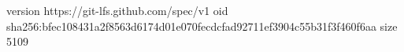 version https://git-lfs.github.com/spec/v1
oid sha256:bfec108431a2f8563d6174d01e070fecdcfad92711ef3904c55b31f3f460f6aa
size 5109
